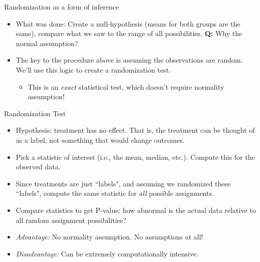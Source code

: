 \begin{frame}{Randomization as a form of inference}
  \begin{itemize}
    \item What was done: Create a null-hypothesis (means for both groups are the same), compare what we saw to the range of all possibilities. \textbf{Q:} Why the normal assumption?
    \item The key to the procedure above is assuming the observations are random. We'll use this logic to create a \alert{randomization test}.
    \begin{itemize}
      \item This is an \emph{exact} statistical test, which doesn't require normality assumption!
    \end{itemize}
  \end{itemize}
  
  \framebreak
  
  \begin{block}{Randomization Test}
    \begin{itemize}
      \item Hypothesis: treatment has no effect. That is, the treatment can be thought of as a label, not something that would change outcomes.
      \item Pick a statistic of interest (i.e., the mean, median, etc.). Compute this for the observed data.
      \item Since treatments are just ``labels", and assuming we randomized these ``labels", compute the same statistic for \emph{all} possible assignments.
      \item Compare statistics to get P-value: how abnormal is the actual data relative to all random assignment possibilities? 
    \end{itemize}
  \end{block}
  
  \framebreak
  
  \begin{itemize}
    \item \emph{Advantage:} No normality assumption. No assumptions at all!
    \item \emph{Disadvantage:} Can be extremely computationally intensive.
  \end{itemize}
  

\end{frame}
